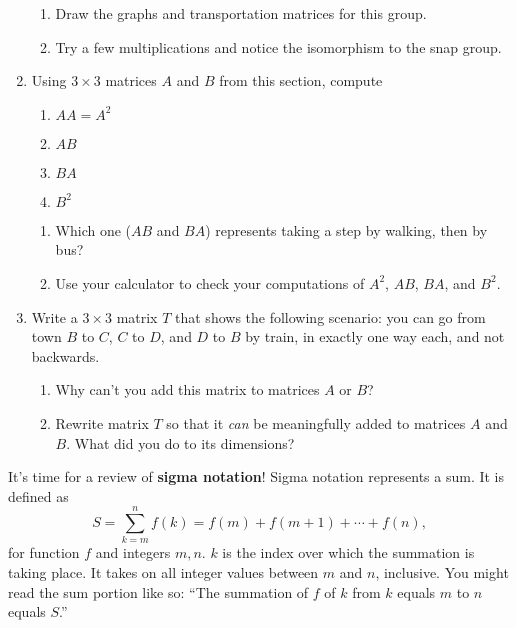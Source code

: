 \documentclass[../gatm.tex]{subfiles}
\begin{document}
\begin{enumerate}
\begin{enumerate}
\item Draw the graphs and transportation matrices for this group.
\item Try a few multiplications and notice the isomorphism to the snap group.
\end{enumerate}
\item Using $3\times 3$ matrices $A$ and $B$ from this section, compute
\begin{multicols}{4}
\begin{enumerate}
\item $AA=A^2$
\item $AB$
\item $BA$
\item $B^2$
\setcounter{mtrx_mult_problem_ii}{\value{enumii}}
\end{enumerate}
\end{multicols}
\begin{enumerate}
\setcounter{enumii}{\value{mtrx_mult_problem_ii}}
\item Which one ($AB$ and $BA$) represents taking a step by walking, then by bus?
\item Use your calculator to check your computations of $A^2$, $AB$, $BA$, and $B^2$.
\end{enumerate}
\item Write a $3\times 3$ matrix $T$ that shows the following scenario: you can go from town $B$ to $C$, $C$ to $D$, and $D$ to $B$ by train, in exactly one way each, and not backwards.
\begin{enumerate}
\item Why can't you add this matrix to matrices $A$ or $B$?
\item Rewrite matrix $T$ so that it \textit{can} be meaningfully added to matrices $A$ and $B$. What did you do to its dimensions?
\end{enumerate}
\setcounter{mtrx_mult_problem_i}{\value{enumi}}
\end{enumerate}

It's time for a review of \textbf{sigma notation}! Sigma notation represents a sum. It is defined as
$$S=\sum_{k=m}^{n} f(k)=f(m)+f(m+1)+\cdots + f(n),$$
for function $f$ and integers $m,n$. $k$ is the index over which the summation is taking place. It takes on all integer values between $m$ and $n$, inclusive. You might read the sum portion like so: ``The summation of $f$ of $k$ from $k$ equals $m$ to $n$ equals $S$.''
\end{document}
